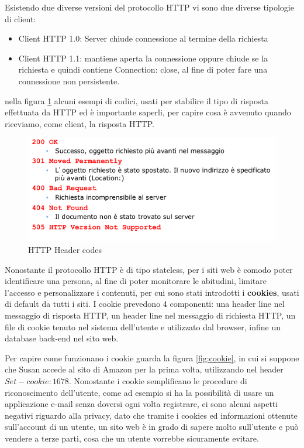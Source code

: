 \documentclass[a4paper,12pt, oneside]{book}
\begin{document}
Esistendo due diverse versioni del protocollo HTTP vi sono due diverse tipologie di client:
\begin{itemize}
	\item Client HTTP 1.0: Server chiude connessione al termine della richiesta
	\item Client HTTP 1.1: mantiene aperta la connessione oppure chiude se la richiesta e quindi
	      contiene Connection: close, al fine di poter fare una connessione non persistente.
\end{itemize}
nella figura \ref{http:headerCode} alcuni esempi di codici, usati per stabilire il tipo di risposta 
effettuata da HTTP ed è importante saperli, per capire cosa è avvenuto quando riceviamo, come client,
la risposta HTTP.

\begin{figure}
    \caption{HTTP Header codes}
    \label{http:headerCode}
	\includegraphics[scale=0.7]{img/http3.png}
\end{figure}
Nonostante il protocollo HTTP è di tipo stateless, per i siti web è comodo poter identificare una persona,
al fine di poter monitorare le abitudini, limitare l'accesso e personalizzare i contenuti, per cui sono 
stati introdotti i \textbf{cookies}, usati di default da tutti i siti.\newline
I cookie prevedono 4 componenti: una header line nel messaggio di risposta HTTP, un header line nel
messaggio di richiesta HTTP, un file di cookie tenuto nel sistema dell'utente e utilizzato dal browser,
infine un database back-end nel sito web.

Per capire come funzionano i cookie guarda la figura \ref{fig:cookie}, in cui si suppone che 
Susan accede al sito di Amazon per la prima volta, utilizzando nel header $Set-cookie: 1678$.\newline
Nonostante i cookie semplificano le procedure di riconoscimento dell'utente, come ad esempio 
si ha la possibilità di usare un applicazione e-mail senza doversi ogni volta registrare, 
ci sono alcuni aspetti negativi riguardo alla privacy, dato che tramite i cookies ed informazioni
ottenute sull'account di un utente, un sito web è in grado di sapere molto sull'utente e può 
vendere a terze parti, cosa che un utente vorrebbe sicuramente evitare.
\end{document}
